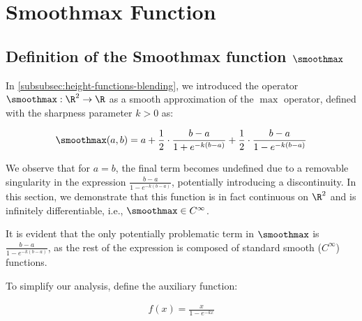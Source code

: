 \chapter{Smoothmax Function}
\label{chap:smoothmax-proof}


\section{Definition of the Smoothmax function $\smoothmax$}

In \cref{subsubsec:height-functions-blending}, we introduced the operator $\smoothmax: \R^2 \to \R$ as a smooth approximation of the $\max$ operator, defined with the sharpness parameter $k > 0$ as:

\begin{align}
    \smoothmax(a, b) = a + \frac{1}{2} \cdot \frac{b - a}{1 + e^{-k(b - a)}} + \frac{1}{2} \cdot \frac{b - a}{1 - e^{-k(b - a)}}
\end{align}

We observe that for $a = b$, the final term becomes undefined due to a removable singularity in the expression $\frac{b - a}{1 - e^{-k(b - a)}}$, potentially introducing a discontinuity. In this section, we demonstrate that this function is in fact continuous on $\R^2$ and is infinitely differentiable, i.e., $\smoothmax \in C^\infty$.

It is evident that the only potentially problematic term in $\smoothmax$ is $\frac{b - a}{1 - e^{-k(b - a)}}$, as the rest of the expression is composed of standard smooth ($C^\infty$) functions.

To simplify our analysis, define the auxiliary function:

\begin{align}
    f(x) = \frac{x}{1 - e^{-kx}}
\end{align}

